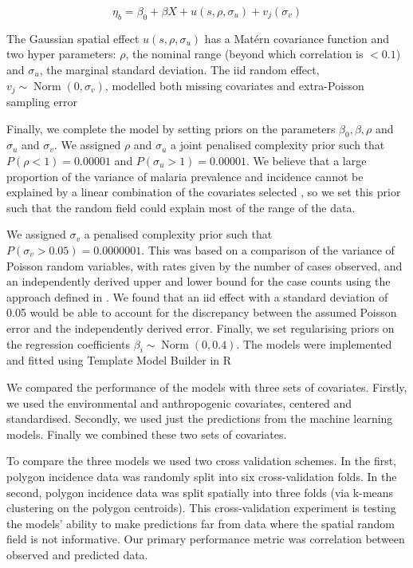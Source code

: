 \documentclass[11pt]{article}
\begin{document}
$$\eta_b = \beta_0 + \beta X  + u(s, \rho, \sigma_u) + v_j(\sigma_v)$$

The Gaussian spatial effect $u(s, \rho, \sigma_u)$ has a Mat\'ern covariance function and two hyper parameters: $\rho$, the nominal range (beyond which correlation is $< 0.1$) and $\sigma_u$, the marginal standard deviation.
The iid random effect, $v_j \sim \operatorname{Norm}(0, \sigma_v)$, modelled both missing covariates and extra-Poisson sampling error

Finally, we complete the model by setting priors on the parameters $\beta_0, \beta, \rho$ and $\sigma_u$ and $\sigma_v$. We assigned $\rho$ and $\sigma_u$ a joint penalised complexity prior \citep{fuglstad2018constructing} such that $P(\rho < 1) = 0.00001$ and $P(\sigma_u > 1) = 0.00001$. 
We believe that a large proportion of the variance of malaria prevalence and incidence cannot be explained by a linear combination of the covariates selected \citep{bhatt2017improved}, so we set this prior such that the random field could explain most of the range of the data.

We assigned $\sigma_v$ a penalised complexity prior \citep{simpson2017penalising} such that $P(\sigma_v > 0.05) = 0.0000001$. This was based on a comparison of the variance of Poisson random variables, with rates given by the number of cases observed, and an independently derived upper and lower bound for the case counts using the approach defined in \citep{cibulskis2011worldwide}. We found that an iid effect with a standard deviation of 0.05 would be able to account for the discrepancy between the assumed Poisson error and the independently derived error.
Finally, we set regularising priors on the regression coefficients $\beta_i \sim \operatorname{ Norm}(0, 0.4)$. 
The models were implemented and fitted using Template Model Builder \citep{TMB} in R \citep{R}

We compared the performance of the models with three sets of covariates.
Firstly, we used the environmental and anthropogenic covariates, centered and standardised.
Secondly, we used just the predictions from the machine learning models.
Finally we combined these two sets of covariates.

To compare the three models we used two cross validation schemes. 
In the first, polygon incidence data was randomly split into six cross-validation folds.
In the second, polygon incidence data was split spatially into three folds (via k-means clustering on the polygon centroids).
This cross-validation experiment is testing the models’ ability to make predictions far from data where the spatial random field is not informative.
Our primary performance metric was correlation between observed and predicted data.
\end{document}
